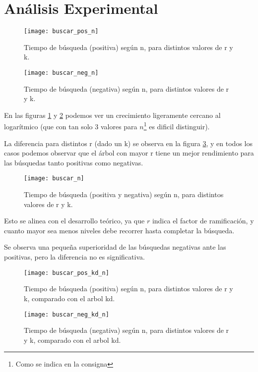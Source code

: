 \section{Análisis Experimental}

\begin{figure}
  \begin{center}
  \texttt{[image: buscar\_pos\_n]}
  \caption{Tiempo de búsqueda (positiva)
    según n, para distintos valores de r y k.}
  \label{fig:buscar-pos}
  \end{center}
\end{figure}


\begin{figure}
  \begin{center}
  \texttt{[image: buscar\_neg\_n]}
  \caption{Tiempo de búsqueda (negativa)
    según n, para distintos valores de r y k.}
  \label{fig:buscar-neg}
  \end{center}
\end{figure}

En las figuras \ref{fig:buscar-pos} y \ref{fig:buscar-neg} podemos
ver un crecimiento ligeramente cercano al logarítmico (que con tan solo 3
valores para \(n\)\footnote{Como se indica en la consigna} es dificil
distinguir).

La diferencia para distintos r (dado un k) se observa en la figura
\ref{fig:buscar}, y en todos los casos podemos observar que el árbol
con mayor r tiene un mejor rendimiento para las búsquedas tanto positivas como
negativas.

\begin{figure}
  \begin{center}
  \texttt{[image: buscar\_n]}
  \caption{Tiempo de búsqueda (positiva y negativa)
    según n, para distintos valores de r y k.}
  \label{fig:buscar}
  \end{center}
\end{figure}

Esto se alinea con el desarrollo teórico, ya que \(r\) indica el factor de
ramificación, y cuanto mayor sea menos niveles debe recorrer hasta completar la
búsqueda.

Se observa una pequeña superioridad de las búsquedas negativas ante las positivas,
pero la diferencia no es significativa.

\begin{figure}
  \begin{center}
  \texttt{[image: buscar\_pos\_kd\_n]}
  \caption{Tiempo de búsqueda (positiva)
    según n, para distintos valores de r y k, comparado con el arbol kd.}
  \label{fig:pos-kd}
  \end{center}
\end{figure}


\begin{figure}
  \begin{center}
  \texttt{[image: buscar\_neg\_kd\_n]}
  \caption{Tiempo de búsqueda (negativa)
    según n, para distintos valores de r y k, comparado con el arbol kd.}
  \label{fig:neg-kd}
  \end{center}
\end{figure}